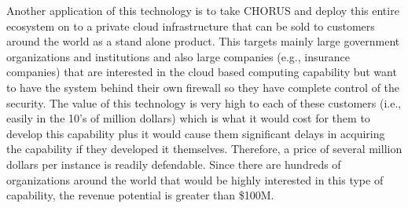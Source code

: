 Another application of this technology is to take CHORUS and deploy
this entire ecosystem on to a private cloud infrastructure that can be
sold to customers around the world as a stand alone product.  This
targets mainly large government organizations and institutions and
also large companies (e.g., insurance companies) that are interested
in the cloud based computing capability but want to have the system
behind their own firewall so they have complete control of the
security.  The value of this technology is very high to each of these
customers (i.e., easily in the 10's of million dollars) which is what
it would cost for them to develop this capability plus it would cause
them significant delays in acquiring the capability if they developed
it themselves. Therefore, a price of several million dollars per
instance is readily defendable.  Since there are hundreds of
organizations around the world that would be highly interested in this
type of capability, the revenue potential is greater than \$100M.

